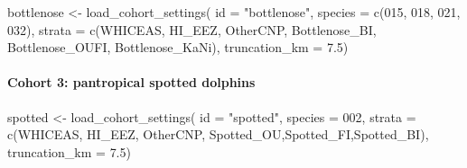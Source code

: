 \documentclass[
]{book}
\newenvironment{Shaded}{\begin{snugshade}}{\end{snugshade}}
\newcommand{\AttributeTok}[1]{\textcolor[rgb]{0.77,0.63,0.00}{#1}}
\newcommand{\FloatTok}[1]{\textcolor[rgb]{0.00,0.00,0.81}{#1}}
\newcommand{\FunctionTok}[1]{\textcolor[rgb]{0.00,0.00,0.00}{#1}}
\newcommand{\NormalTok}[1]{#1}
\newcommand{\OtherTok}[1]{\textcolor[rgb]{0.56,0.35,0.01}{#1}}
\newcommand{\StringTok}[1]{\textcolor[rgb]{0.31,0.60,0.02}{#1}}
\begin{document}
\begin{Shaded}
\begin{Highlighting}[]
\NormalTok{bottlenose }\OtherTok{\textless{}{-}} \FunctionTok{load\_cohort\_settings}\NormalTok{(}
  \AttributeTok{id =} \StringTok{"bottlenose"}\NormalTok{,}
  \AttributeTok{species =} \FunctionTok{c}\NormalTok{(}\StringTok{\textquotesingle{}015\textquotesingle{}}\NormalTok{, }\StringTok{\textquotesingle{}018\textquotesingle{}}\NormalTok{, }\StringTok{\textquotesingle{}021\textquotesingle{}}\NormalTok{, }\StringTok{\textquotesingle{}032\textquotesingle{}}\NormalTok{),}
  \AttributeTok{strata =} \FunctionTok{c}\NormalTok{(}\StringTok{\textquotesingle{}WHICEAS\textquotesingle{}}\NormalTok{, }\StringTok{\textquotesingle{}HI\_EEZ\textquotesingle{}}\NormalTok{, }\StringTok{\textquotesingle{}OtherCNP\textquotesingle{}}\NormalTok{,}
             \StringTok{\textquotesingle{}Bottlenose\_BI\textquotesingle{}}\NormalTok{, }\StringTok{\textquotesingle{}Bottlenose\_OUFI\textquotesingle{}}\NormalTok{, }\StringTok{\textquotesingle{}Bottlenose\_KaNi\textquotesingle{}}\NormalTok{),}
  \AttributeTok{truncation\_km =} \FloatTok{7.5}\NormalTok{)}
\end{Highlighting}
\end{Shaded}

\hypertarget{cohort-3-pantropical-spotted-dolphins}{%
\paragraph*{Cohort 3: pantropical spotted dolphins}\label{cohort-3-pantropical-spotted-dolphins}}

\begin{Shaded}
\begin{Highlighting}[]
\NormalTok{spotted }\OtherTok{\textless{}{-}} \FunctionTok{load\_cohort\_settings}\NormalTok{(}
  \AttributeTok{id =} \StringTok{"spotted"}\NormalTok{,}
  \AttributeTok{species =} \StringTok{\textquotesingle{}002\textquotesingle{}}\NormalTok{,}
  \AttributeTok{strata =} \FunctionTok{c}\NormalTok{(}\StringTok{\textquotesingle{}WHICEAS\textquotesingle{}}\NormalTok{, }\StringTok{\textquotesingle{}HI\_EEZ\textquotesingle{}}\NormalTok{, }\StringTok{\textquotesingle{}OtherCNP\textquotesingle{}}\NormalTok{,}
             \StringTok{\textquotesingle{}Spotted\_OU\textquotesingle{}}\NormalTok{,}\StringTok{\textquotesingle{}Spotted\_FI\textquotesingle{}}\NormalTok{,}\StringTok{\textquotesingle{}Spotted\_BI\textquotesingle{}}\NormalTok{),}
  \AttributeTok{truncation\_km =} \FloatTok{7.5}\NormalTok{)}
\end{Highlighting}
\end{Shaded}
\end{document}
